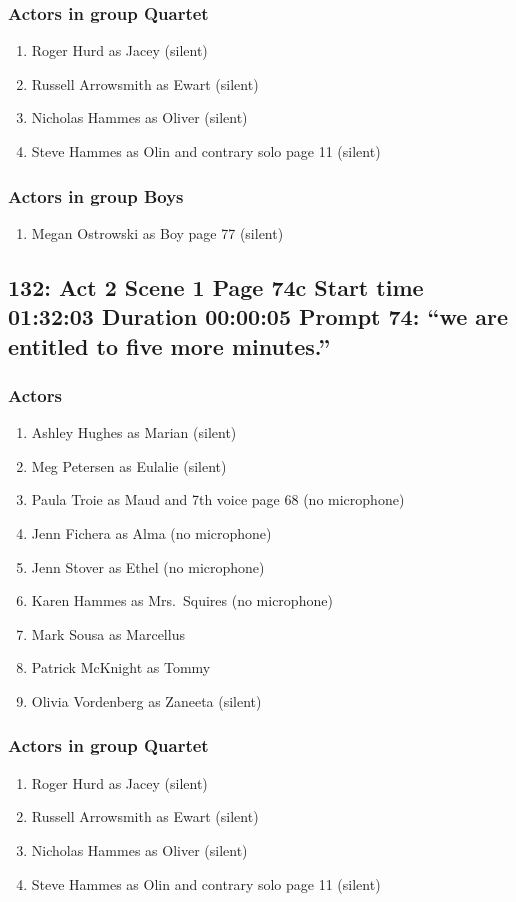 \subsubsection{Actors in group Quartet}
\begin{enumerate}
\item Roger Hurd as Jacey (silent)
\item Russell Arrowsmith as Ewart (silent)
\item Nicholas Hammes as Oliver (silent)
\item Steve Hammes as Olin and contrary solo page 11 (silent)
\end{enumerate}
\subsubsection{Actors in group Boys}
\begin{enumerate}
\item Megan Ostrowski as Boy page 77 (silent)
\end{enumerate}


\subsection{132: Act 2 Scene 1 Page 74c Start time 01:32:03 Duration 00:00:05 Prompt 74: ``we are entitled to five more minutes.''}

\subsubsection{Actors}
\begin{enumerate}
\item Ashley Hughes as Marian (silent)
\item Meg Petersen as Eulalie (silent)
\item Paula Troie as Maud and 7th voice page 68 (no microphone)
\item Jenn Fichera as Alma (no microphone)
\item Jenn Stover as Ethel (no microphone)
\item Karen Hammes as Mrs.~Squires (no microphone)
\item Mark Sousa as Marcellus
\item Patrick McKnight as Tommy
\item Olivia Vordenberg as Zaneeta (silent)
\end{enumerate}
\subsubsection{Actors in group Quartet}
\begin{enumerate}
\item Roger Hurd as Jacey (silent)
\item Russell Arrowsmith as Ewart (silent)
\item Nicholas Hammes as Oliver (silent)
\item Steve Hammes as Olin and contrary solo page 11 (silent)
\end{enumerate}

